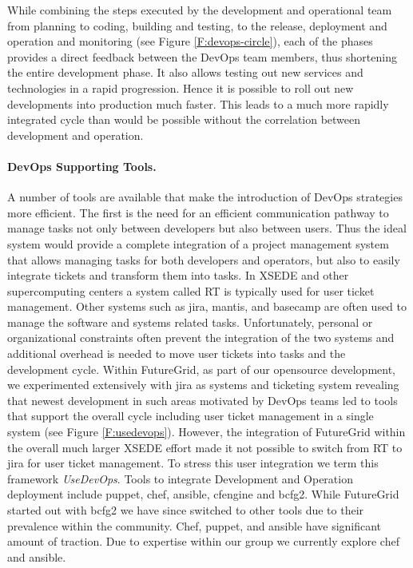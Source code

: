 \documentclass[graybox]{svmult}
\begin{document}
While combining the steps executed by the development and operational team from planning to coding, building and testing, to the release, deployment and operation and monitoring (see Figure \ref{F:devops-circle}), each of the phases provides a direct feedback between the DevOps team members, thus shortening the entire development phase. It also allows testing out new services and technologies in a rapid progression. Hence it is possible to roll out new developments into production much faster. This leads to a much more rapidly integrated cycle than would be possible without the correlation between development and operation.


\paragraph{DevOps Supporting Tools.}


A number of tools are available that make the introduction of DevOps strategies more efficient. The first is the need for an efficient communication pathway to manage tasks not only between developers but also between users. Thus the ideal system would provide a complete integration of a project management system that allows managing tasks for both developers and operators, but also to easily integrate tickets and transform them into tasks. In XSEDE and other supercomputing centers a system called RT \cite{www-rt} is typically used for user ticket management. Other systems such as jira, mantis, and basecamp are often used to manage the software and systems related tasks. Unfortunately, personal or organizational constraints often prevent the integration of the two systems and additional overhead is needed to move user tickets into tasks and the development cycle. Within FutureGrid, as part of our opensource development, we experimented extensively with jira as systems and ticketing system \cite{www-jira-ticket} revealing that newest development in such areas motivated by DevOps teams led to tools that support the overall cycle including user ticket management in a single system (see Figure \ref{F:usedevops}). However, the integration of FutureGrid within the overall much larger XSEDE effort made it not possible to switch from RT to jira for user ticket management. To stress this user integration we term this framework {\em UseDevOps}. Tools to integrate Development and Operation deployment include puppet, chef, ansible, cfengine and bcfg2. While FutureGrid started out with bcfg2 we have since  switched to other tools due to their prevalence within the community. Chef, puppet, and ansible have significant amount of traction. Due to expertise within our group we currently explore chef and ansible.
\end{document}
